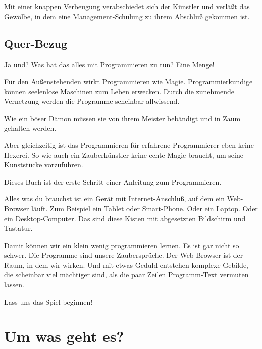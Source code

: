\documentclass[a5paper,ngerman,9pt]{article}
\begin{document}
\begin{multicols}{2}
	Mit einer knappen Verbeugung verabschiedet sich der Künstler und
	verläßt das Gewölbe, in dem eine Management-Schulung zu ihrem
	Abschluß gekommen ist.

	\subsection{Quer-Bezug}

	Ja und?
	Was hat das alles mit Programmieren zu tun?
	Eine Menge!

	Für den Außenstehenden wirkt Programmieren wie Magie.
	Programmierkundige können seelenlose Maschinen zum Leben erwecken.
	Durch die zunehmende Vernetzung werden die Programme scheinbar
	allwissend.

	Wie ein böser Dämon müssen sie von ihrem Meister bebändigt und in
	Zaum gehalten werden.

	Aber gleichzeitig ist das Programmieren für erfahrene Programmierer
	eben keine Hexerei.
	So wie auch ein Zauberkünstler keine echte Magie braucht, um seine
	Kunststücke vorzuführen.

	Dieses Buch ist der erste Schritt einer Anleitung zum Programmieren.
	
	Alles was du brauchst ist ein Gerät mit Internet-Anschluß, auf dem
	ein Web-Browser läuft.
	Zum Beispiel ein Tablet oder Smart-Phone.
	Oder ein Laptop.
	Oder ein Desktop-Computer.
	Das sind diese Kisten mit abgesetzten Bildschirm und Tastatur.

	Damit können wir ein klein wenig programmieren lernen.
	Es ist gar nicht so schwer.
	Die Programme sind unsere Zaubersprüche.
	Der Web-Browser ist der Raum, in dem wir wirken.
	Und mit etwas Geduld entstehen komplexe Gebilde, die scheinbar
	viel mächtiger sind, als die paar Zeilen Programm-Text vermuten
	lassen.

	Lass uns das Spiel beginnen!
\end{multicols}

\section{Um was geht es?}
\end{document}
